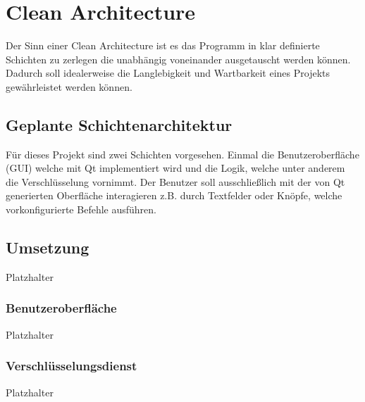 \documentclass[12pt]{article}
\begin{document}
\section{Clean Architecture}
Der Sinn einer Clean Architecture ist es das Programm in klar definierte Schichten zu zerlegen die unabhängig voneinander ausgetauscht werden können. Dadurch soll idealerweise die Langlebigkeit und Wartbarkeit eines Projekts gewährleistet werden können.

\subsection{Geplante Schichtenarchitektur}
Für dieses Projekt sind zwei Schichten vorgesehen. Einmal die Benutzeroberfläche (GUI) welche mit Qt implementiert wird und die Logik, welche unter anderem die Verschlüsselung vornimmt. Der Benutzer soll ausschließlich mit der von Qt generierten Oberfläche interagieren z.B. durch Textfelder oder Knöpfe, welche vorkonfigurierte Befehle ausführen.

\subsection{Umsetzung}
Platzhalter

\subsubsection{Benutzeroberfläche}
Platzhalter

\subsubsection{Verschlüsselungsdienst}
Platzhalter

\newpage
\end{document}
